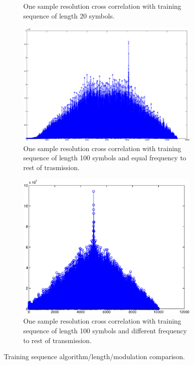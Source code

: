 \documentclass[12pt,a4paper,openright]{article}
\begin{document}
\begin{figure}[h]
\begin{subfigure}[b]{0.5\linewidth}
    \caption{One sample resolution cross correlation with training sequence of length 20 symbols.} 
    \label{fig7:b} 
    \vspace{4ex}
  \end{subfigure} 
  \quad
  \begin{subfigure}[b]{0.5\linewidth}
    \centering
    \includegraphics[width=1\linewidth]{100eq.eps} 
    \caption{One sample resolution cross correlation with training sequence of length 100 symbols and equal frequency to rest of trasmission.} 
    \label{fig7:c} 
  \end{subfigure}%
  \quad
  \begin{subfigure}[b]{0.5\linewidth}
    \centering
    \includegraphics[width=1\linewidth]{100dif.eps} 
    \caption{One sample resolution cross correlation with training sequence of length 100 symbols and different frequency to rest of transmission.} 
    \label{fig7:d} 
  \end{subfigure} 
  \caption{Training sequence algorithm/length/modulation comparison.}
  \label{fig:tscomp} 
\end{figure}
   
\end{document}
